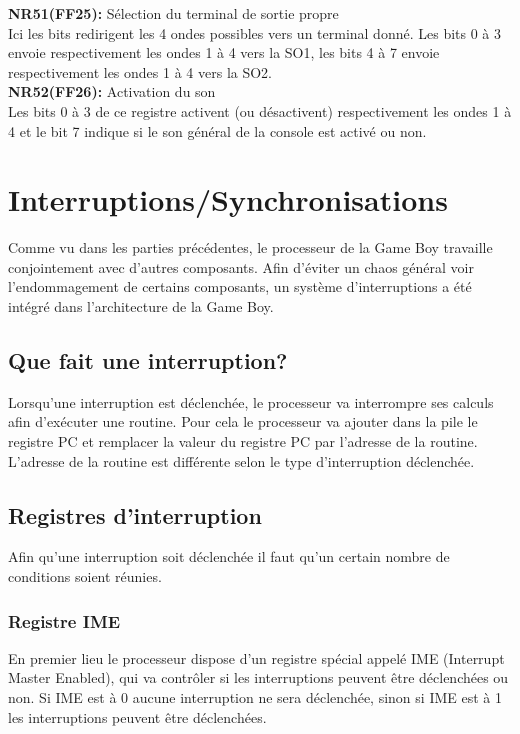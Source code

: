 \documentclass{report}
\begin{document}
	\textbf{NR51(FF25):} Sélection du terminal de sortie propre \\
		Ici les bits redirigent les 4 ondes possibles vers un
		terminal donné.
		Les bits 0 à 3 envoie respectivement les ondes 1 à 4
		vers la SO1, les bits 4 à 7 envoie respectivement les
		ondes 1 à 4 vers la SO2.\\

	\textbf{NR52(FF26):} Activation du son \\
		Les bits 0 à 3 de ce registre activent (ou
		désactivent) respectivement les ondes 1 à 4 et le bit
		7 indique si le son général de la console est activé
		ou non.
\section{Interruptions/Synchronisations}
Comme vu dans les parties précédentes, le processeur de la Game Boy travaille conjointement avec d'autres composants. Afin d'éviter un chaos général voir l'endommagement de certains composants, un système d'interruptions a été intégré dans l'architecture de la Game Boy.
\subsection{Que fait une interruption?}
Lorsqu'une interruption est déclenchée, le processeur va interrompre ses calculs afin d'exécuter une routine. Pour cela le processeur va ajouter dans la pile le registre PC et remplacer la valeur du registre PC par l'adresse de la routine. L'adresse de la routine est différente selon le type d'interruption déclenchée.
\subsection{Registres d'interruption}
Afin qu'une interruption soit déclenchée il faut qu'un certain nombre de conditions soient réunies.
\subsubsection{Registre IME}
En premier lieu le processeur dispose d'un registre spécial appelé IME (Interrupt Master Enabled), qui va contrôler si les interruptions peuvent être déclenchées ou non. Si IME est à 0 aucune interruption ne sera déclenchée, sinon si IME est à 1 les interruptions peuvent être déclenchées.
\end{document}
